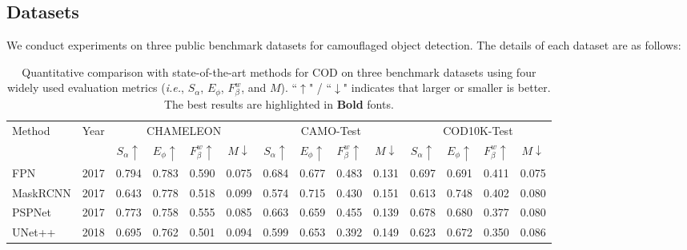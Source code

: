 \documentclass{article}
\def\ie{\emph{i.e.}}
\begin{document}
\subsection{Datasets}
We conduct experiments on three public benchmark datasets for camouflaged object detection. The details of each dataset are as follows:

\begin{table*}[ht]
\caption{Quantitative comparison with state-of-the-art methods for COD on three benchmark datasets using four widely used evaluation metrics (\ie, $S_{\alpha}$, $E_{\phi}$, $F_{\beta}^w$, and $M$). ``$\uparrow$" / ``$\downarrow$" indicates that larger or smaller is better. The best results are highlighted in \textbf{Bold} fonts.}\vspace{-0.25cm}
\renewcommand{\arraystretch}{0.98}
\setlength\tabcolsep{6.5pt}
\footnotesize
\begin{tabular}{l|l|llll|llll|llll}
%
\hline\toprule
\multicolumn{1}{l|}{\multirow{2}{*}{Method}} & 
\multicolumn{1}{c|}{\multirow{2}{*}{Year}} & \multicolumn{4}{c|}{CHAMELEON} & \multicolumn{4}{c|}{CAMO-Test} & \multicolumn{4}{c}{COD10K-Test} \\ \cline{3-14}
 & \multicolumn{1}{c|}{} & \multicolumn{1}{c}{$S_\alpha\uparrow$} & \multicolumn{1}{c}{$E_\phi\uparrow$} & \multicolumn{1}{c}{$F_\beta^w\uparrow$} & \multicolumn{1}{c|}{$M\downarrow$} & \multicolumn{1}{c}{$S_\alpha\uparrow$} & \multicolumn{1}{c}{$E_\phi\uparrow$} & \multicolumn{1}{c}{$F_\beta^w\uparrow$} & \multicolumn{1}{c|}{$M\downarrow$} & \multicolumn{1}{c}{$S_\alpha\uparrow$} & \multicolumn{1}{c}{$E_\phi\uparrow$} & \multicolumn{1}{c}{$F_\beta^w\uparrow$} & \multicolumn{1}{c}{$M\downarrow$} \\ \midrule
FPN & 2017 & 0.794 & 0.783 & 0.590 & 0.075 & 0.684 & 0.677 & 0.483 & 0.131 & 0.697 & 0.691 & 0.411 & 0.075 \\ 
MaskRCNN & 2017 & 0.643 & 0.778 & 0.518 & 0.099 & 0.574 & 0.715 & 0.430 & 0.151 & 0.613 & 0.748 & 0.402 & 0.080 \\ 
PSPNet & 2017 & 0.773 & 0.758 & 0.555 & 0.085 & 0.663 & 0.659 & 0.455 & 0.139 & 0.678 & 0.680 & 0.377 & 0.080 \\ 
UNet++ & 2018 & 0.695 & 0.762 & 0.501 & 0.094 & 0.599 & 0.653 & 0.392 & 0.149 & 0.623 & 0.672 & 0.350 & 0.086 \\ 

\end{tabular}
\end{table*}
\end{document}
